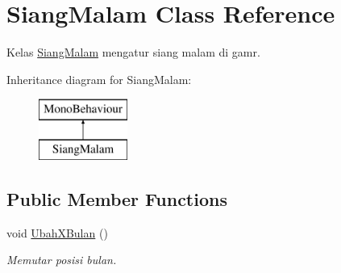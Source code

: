 \hypertarget{class_siang_malam}{}\section{Siang\+Malam Class Reference}
\label{class_siang_malam}


Kelas \hyperlink{class_siang_malam}{Siang\+Malam} mengatur siang malam di gamr.  


Inheritance diagram for Siang\+Malam\+:\begin{figure}[H]
\begin{center}
\leavevmode
\includegraphics[height=2.000000cm]{class_siang_malam}
\end{center}
\end{figure}
\subsection*{Public Member Functions}
\begin{DoxyCompactItemize}
\item 
void \hyperlink{class_siang_malam_a1fccd6abbcae495a27af288d2aabf9a6}{Ubah\+X\+Bulan} ()
\begin{DoxyCompactList}\small\item\em Memutar posisi bulan. \end{DoxyCompactList}\end{DoxyCompactItemize}

